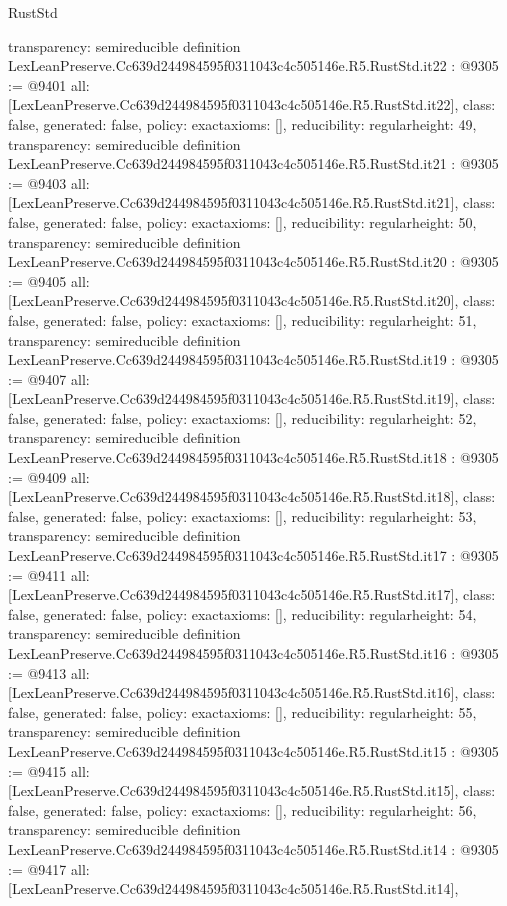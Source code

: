 \begin{lexlean}{RustStd}
\begin{coremodule}
{  transparency: semireducible
}
definition LexLeanPreserve.Cc639d244984595f0311043c4c505146e.R5.RustStd.it22 : @9305 := @9401 {
  all: [LexLeanPreserve.Cc639d244984595f0311043c4c505146e.R5.RustStd.it22],
  class: false,
  generated: false,
  policy: exact{axioms: []},
  reducibility: regular{height: 49},
  transparency: semireducible
}
definition LexLeanPreserve.Cc639d244984595f0311043c4c505146e.R5.RustStd.it21 : @9305 := @9403 {
  all: [LexLeanPreserve.Cc639d244984595f0311043c4c505146e.R5.RustStd.it21],
  class: false,
  generated: false,
  policy: exact{axioms: []},
  reducibility: regular{height: 50},
  transparency: semireducible
}
definition LexLeanPreserve.Cc639d244984595f0311043c4c505146e.R5.RustStd.it20 : @9305 := @9405 {
  all: [LexLeanPreserve.Cc639d244984595f0311043c4c505146e.R5.RustStd.it20],
  class: false,
  generated: false,
  policy: exact{axioms: []},
  reducibility: regular{height: 51},
  transparency: semireducible
}
definition LexLeanPreserve.Cc639d244984595f0311043c4c505146e.R5.RustStd.it19 : @9305 := @9407 {
  all: [LexLeanPreserve.Cc639d244984595f0311043c4c505146e.R5.RustStd.it19],
  class: false,
  generated: false,
  policy: exact{axioms: []},
  reducibility: regular{height: 52},
  transparency: semireducible
}
definition LexLeanPreserve.Cc639d244984595f0311043c4c505146e.R5.RustStd.it18 : @9305 := @9409 {
  all: [LexLeanPreserve.Cc639d244984595f0311043c4c505146e.R5.RustStd.it18],
  class: false,
  generated: false,
  policy: exact{axioms: []},
  reducibility: regular{height: 53},
  transparency: semireducible
}
definition LexLeanPreserve.Cc639d244984595f0311043c4c505146e.R5.RustStd.it17 : @9305 := @9411 {
  all: [LexLeanPreserve.Cc639d244984595f0311043c4c505146e.R5.RustStd.it17],
  class: false,
  generated: false,
  policy: exact{axioms: []},
  reducibility: regular{height: 54},
  transparency: semireducible
}
definition LexLeanPreserve.Cc639d244984595f0311043c4c505146e.R5.RustStd.it16 : @9305 := @9413 {
  all: [LexLeanPreserve.Cc639d244984595f0311043c4c505146e.R5.RustStd.it16],
  class: false,
  generated: false,
  policy: exact{axioms: []},
  reducibility: regular{height: 55},
  transparency: semireducible
}
definition LexLeanPreserve.Cc639d244984595f0311043c4c505146e.R5.RustStd.it15 : @9305 := @9415 {
  all: [LexLeanPreserve.Cc639d244984595f0311043c4c505146e.R5.RustStd.it15],
  class: false,
  generated: false,
  policy: exact{axioms: []},
  reducibility: regular{height: 56},
  transparency: semireducible
}
definition LexLeanPreserve.Cc639d244984595f0311043c4c505146e.R5.RustStd.it14 : @9305 := @9417 {
  all: [LexLeanPreserve.Cc639d244984595f0311043c4c505146e.R5.RustStd.it14],
}
\end{coremodule}
\end{lexlean}

